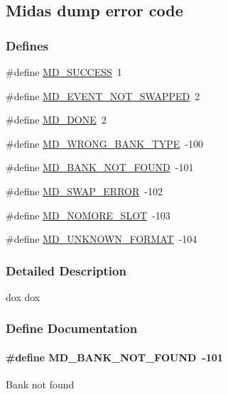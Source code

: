 \subsection{Midas dump error code}
\label{group__mdsupporterrorh}
\subsubsection*{Defines}
\begin{DoxyCompactItemize}
\item 
\#define \hyperlink{group__mdsupporterrorh_gab1b41e3db6549318f90440ed951d9cf8}{MD\_\-SUCCESS}~1
\item 
\#define \hyperlink{group__mdsupporterrorh_ga34a6e506a7e596c2c044e51ed5d8359d}{MD\_\-EVENT\_\-NOT\_\-SWAPPED}~2
\item 
\#define \hyperlink{group__mdsupporterrorh_ga34fdf952284be03aca04a46985b2e57f}{MD\_\-DONE}~2
\item 
\#define \hyperlink{group__mdsupporterrorh_ga272861cd4d9ff8e05d3f2aafc4489f10}{MD\_\-WRONG\_\-BANK\_\-TYPE}~-\/100
\item 
\#define \hyperlink{group__mdsupporterrorh_gae69cfc80b79b199b65adac21a8dad19c}{MD\_\-BANK\_\-NOT\_\-FOUND}~-\/101
\item 
\#define \hyperlink{group__mdsupporterrorh_gaff1a819016cbf8084d88e0f78e548b60}{MD\_\-SWAP\_\-ERROR}~-\/102
\item 
\#define \hyperlink{group__mdsupporterrorh_ga0491dd8f0e546f496c4059b8c04dd309}{MD\_\-NOMORE\_\-SLOT}~-\/103
\item 
\#define \hyperlink{group__mdsupporterrorh_gae2f17985734efbefedfd5956b4e4a0f8}{MD\_\-UNKNOWN\_\-FORMAT}~-\/104
\end{DoxyCompactItemize}


\subsubsection{Detailed Description}
dox dox 

\subsubsection{Define Documentation}
\paragraph[{MD\_\-BANK\_\-NOT\_\-FOUND}]{\setlength{\rightskip}{0pt plus 5cm}\#define MD\_\-BANK\_\-NOT\_\-FOUND~-\/101}\hfill\label{group__mdsupporterrorh_gae69cfc80b79b199b65adac21a8dad19c}
Bank not found 

